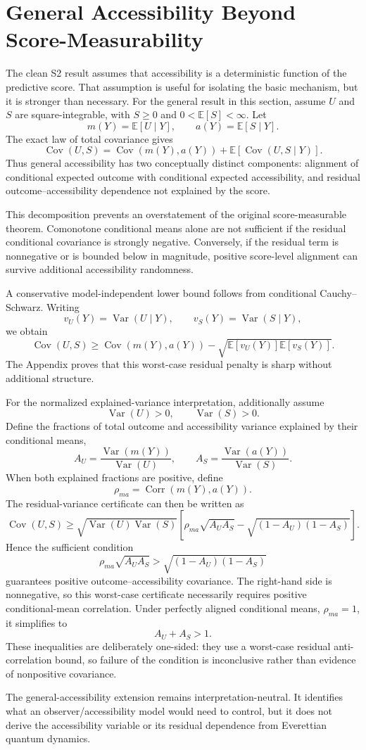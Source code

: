 \section{General Accessibility Beyond Score-Measurability}

The clean S2 result assumes that accessibility is a deterministic function of the predictive score. That assumption is useful for isolating the basic mechanism, but it is stronger than necessary. For the general result in this section, assume $U$ and $S$ are square-integrable, with $S\ge0$ and $0<\mathbb E[S]<\infty$. Let
\[
m(Y)=\mathbb E[U\mid Y],
\qquad
a(Y)=\mathbb E[S\mid Y].
\]
The exact law of total covariance gives
\[
\operatorname{Cov}(U,S)
=
\operatorname{Cov}(m(Y),a(Y))
+
\mathbb E[\operatorname{Cov}(U,S\mid Y)].
\]
Thus general accessibility has two conceptually distinct components: alignment of conditional expected outcome with conditional expected accessibility, and residual outcome--accessibility dependence not explained by the score.

This decomposition prevents an overstatement of the original score-measurable theorem. Comonotone conditional means alone are not sufficient if the residual conditional covariance is strongly negative. Conversely, if the residual term is nonnegative or is bounded below in magnitude, positive score-level alignment can survive additional accessibility randomness.

A conservative model-independent lower bound follows from conditional Cauchy--Schwarz. Writing
\[
v_U(Y)=\operatorname{Var}(U\mid Y),
\qquad
v_S(Y)=\operatorname{Var}(S\mid Y),
\]
we obtain
\[
\operatorname{Cov}(U,S)
\ge
\operatorname{Cov}(m(Y),a(Y))
-
\sqrt{
\mathbb E[v_U(Y)]
\mathbb E[v_S(Y)]
}.
\]
The Appendix proves that this worst-case residual penalty is sharp without additional structure.

For the normalized explained-variance interpretation, additionally assume
\[
\operatorname{Var}(U)>0,
\qquad
\operatorname{Var}(S)>0.
\]
Define the fractions of total outcome and accessibility variance explained by their conditional means,
\[
A_U
=
\frac{\operatorname{Var}(m(Y))}{\operatorname{Var}(U)},
\qquad
A_S
=
\frac{\operatorname{Var}(a(Y))}{\operatorname{Var}(S)}.
\]
When both explained fractions are positive, define
\[
\rho_{ma}
=
\operatorname{Corr}(m(Y),a(Y)).
\]
The residual-variance certificate can then be written as
\[
\operatorname{Cov}(U,S)
\ge
\sqrt{\operatorname{Var}(U)\operatorname{Var}(S)}
\left[
\rho_{ma}\sqrt{A_UA_S}
-
\sqrt{(1-A_U)(1-A_S)}
\right].
\]
Hence the sufficient condition
\[
\rho_{ma}\sqrt{A_UA_S}
>
\sqrt{(1-A_U)(1-A_S)}
\]
guarantees positive outcome--accessibility covariance. The right-hand side is nonnegative, so this worst-case certificate necessarily requires positive conditional-mean correlation. Under perfectly aligned conditional means, $\rho_{ma}=1$, it simplifies to
\[
A_U+A_S>1.
\]
These inequalities are deliberately one-sided: they use a worst-case residual anti-correlation bound, so failure of the condition is inconclusive rather than evidence of nonpositive covariance.

The general-accessibility extension remains interpretation-neutral. It identifies what an observer/accessibility model would need to control, but it does not derive the accessibility variable or its residual dependence from Everettian quantum dynamics.
